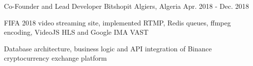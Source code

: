 \begin{cventries}
  \cventry
    {Co-Founder and Lead Developer} %
    {Bitshopit} %
    {Algiers, Algeria} %
    {Apr. 2018 - Dec. 2018} %
    {
      \begin{cvitems} %
        \item {FIFA 2018 video streaming site, implemented RTMP, Redis queues, ffmpeg encoding, VideoJS HLS and Google IMA VAST}
        \item {Database architecture, business logic and API integration of Binance cryptocurrency exchange platform}
      \end{cvitems}
    }

\end{cventries}
